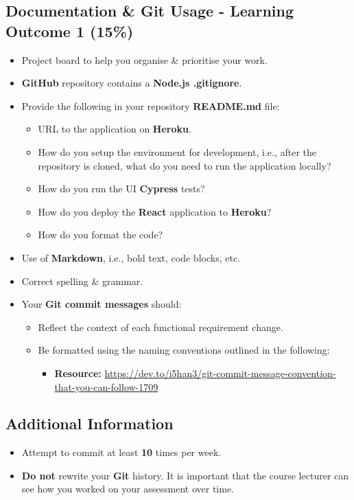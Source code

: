 \documentclass{article}
\begin{document}
\subsection*{Documentation \& Git Usage - Learning Outcome 1 (15\%)}
\begin{itemize}
	\item Project board to help you organise \& prioritise your work. 
	\item \textbf{GitHub} repository contains a \textbf{Node.js .gitignore}.
	\item Provide the following in your repository \textbf{README.md} file:
		\begin{itemize}
		\item URL to the application on \textbf{Heroku}.
		\item How do you setup the environment for development, i.e., after the repository is cloned, what do you need to run the application locally?
		\item How do you run the UI \textbf{Cypress} tests?
		\item How do you deploy the \textbf{React} application to \textbf{Heroku}?
		\item How do you format the code?
		\end{itemize}
		\item Use of \textbf{Markdown}, i.e., bold text, code blocks, etc.
		\item Correct spelling \& grammar. 
	\item Your \textbf{Git commit messages} should:
	      \begin{itemize}
	      	\item Reflect the context of each functional requirement change. 
	      	\item Be formatted using the naming conventions outlined in the following:
	      	      \begin{itemize}
	      	      	\item \textbf{Resource:} \small\href{https://dev.to/i5han3/git-commit-message-convention-that-you-can-follow-1709}{https://dev.to/i5han3/git-commit-message-convention-that-you-can-follow-1709}
	      	      \end{itemize} 
	      \end{itemize}
\end{itemize}
          
\subsection*{Additional Information}
\begin{itemize}
    \item Attempt to commit at least \textbf{10} times per week.
    \item \textbf{Do not} rewrite your \textbf{Git} history. It is important that the course lecturer can see how you worked on your assessment over time. 
\end{itemize} 
\end{document}
